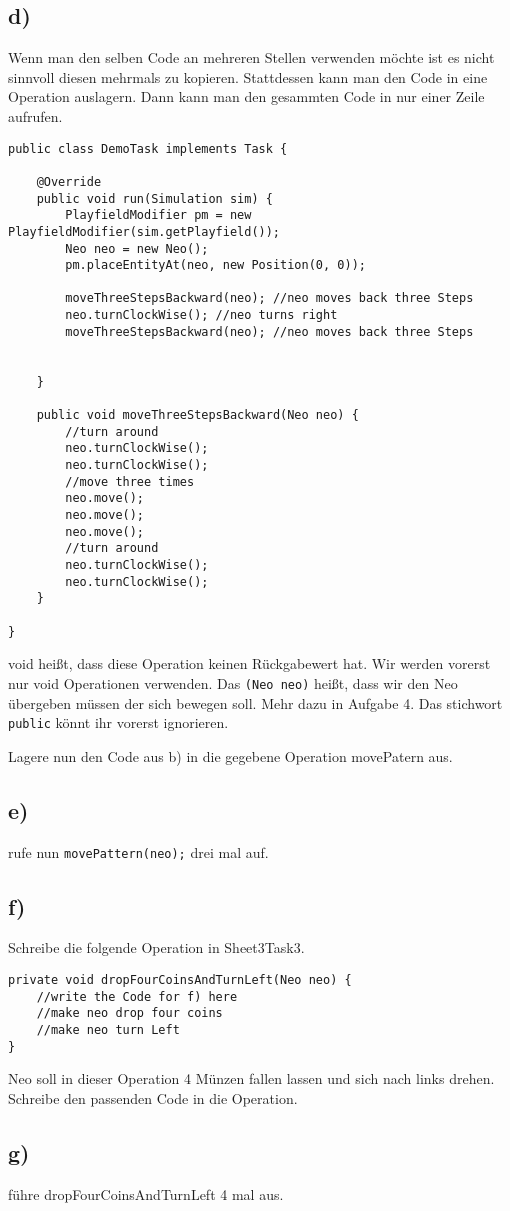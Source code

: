 \subsection*{d)}
	\begin{Infobox}[Operation]
		Wenn man den selben Code an mehreren Stellen verwenden möchte ist es nicht sinnvoll diesen mehrmals zu kopieren. Stattdessen kann man den Code in eine Operation auslagern. Dann kann man den gesammten Code in nur einer Zeile  aufrufen.
				\begin{lstlisting}
public class DemoTask implements Task {
    
    @Override
    public void run(Simulation sim) {
        PlayfieldModifier pm = new PlayfieldModifier(sim.getPlayfield());
        Neo neo = new Neo();
        pm.placeEntityAt(neo, new Position(0, 0));
     
        moveThreeStepsBackward(neo); //neo moves back three Steps
        neo.turnClockWise(); //neo turns right
        moveThreeStepsBackward(neo); //neo moves back three Steps
	
        
    }
    
    public void moveThreeStepsBackward(Neo neo) {
        //turn around
        neo.turnClockWise();
        neo.turnClockWise();
        //move three times
        neo.move();
        neo.move();
        neo.move();
        //turn around
        neo.turnClockWise();
        neo.turnClockWise();
    }
    
}
		\end{lstlisting}
void heißt, dass diese Operation keinen Rückgabewert hat. 
Wir werden vorerst nur void Operationen verwenden. 
Das \lstinline{(Neo neo)} heißt, dass wir den Neo übergeben müssen der sich bewegen soll. 
Mehr dazu in Aufgabe 4. 
Das stichwort \lstinline{public} könnt ihr vorerst ignorieren.
 	\end{Infobox}
Lagere nun den Code aus b) in die gegebene Operation movePatern aus.
\subsection*{e)}
rufe nun \lstinline{movePattern(neo);} drei mal auf.
\subsection*{f)}
Schreibe die folgende Operation in Sheet3Task3.
\begin{lstlisting}
private void dropFourCoinsAndTurnLeft(Neo neo) {
    //write the Code for f) here
    //make neo drop four coins
    //make neo turn Left
}
\end{lstlisting}
Neo soll in dieser Operation 4 Münzen fallen lassen und sich nach links drehen. Schreibe den passenden Code in die Operation.
\subsection*{g)}
führe dropFourCoinsAndTurnLeft 4 mal aus.
